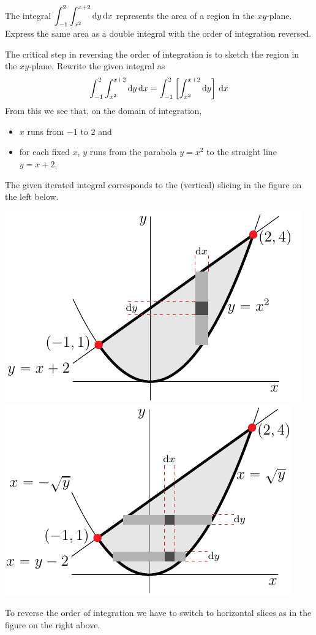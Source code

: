 \begin{eg}\label{eg dblInt D}
The integral $\displaystyle\int_{-1}^2\int_{x^2}^{x+2}\mathrm{d}y\,\mathrm{d}x$
represents the area of a region in the $xy$-plane. Express the same area
as a double integral with the order of integration reversed.

\soln The critical step in reversing the order of integration is
to sketch the region in the $xy$-plane. Rewrite the given integral as
\begin{equation*}
\int_{-1}^2\int_{x^2}^{x+2}\mathrm{d}y\,\mathrm{d}x
=\int_{-1}^2\left[\int_{x^2}^{x+2}\mathrm{d}y\right]\,\mathrm{d}x
\end{equation*}
From this we see that, on the domain of integration,
\begin{itemize}
\item
$x$ runs from $-1$ to $2$ and
\item
for each fixed $x$, $y$ runs from the parabola $y=x^2$ to the straight line $y=x+2$.
\end{itemize}
The given iterated integral corresponds to the (vertical) slicing in the figure
on the left below.
\begin{wfig}
\begin{center}
   \includegraphics{reverseA.pdf}\ 
   \includegraphics{reverseB.pdf}
\end{center}
\end{wfig}
To reverse the order of integration we have to switch to horizontal
slices as in the figure on the right above. 


\end{eg}
